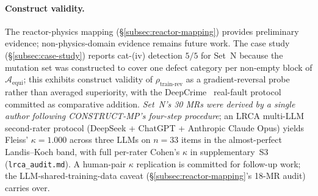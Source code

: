 \documentclass[acmsmall, screen]{acmart}
\begin{document}
\paragraph{Construct validity.} The reactor-physics mapping (\S\ref{subsec:reactor-mapping}) provides preliminary evidence; non-physics-domain evidence remains future work. The case study (\S\ref{subsec:case-study}) reports cat-(iv) detection $5/5$ for Set~N because the mutation set was constructed to cover one defect category per non-empty block of $\mathcal{A}_{\mathrm{equi}}$; this exhibits construct validity of $\rho_{\mathrm{train\text{-}rev}}$ as a gradient-reversal probe rather than averaged superiority, with the DeepCrime~\cite{Humbatova2021DeepCrime} real-fault protocol committed as comparative addition. \emph{Set~N's 30 MRs were derived by a single author following CONSTRUCT-MP's four-step procedure}; an LRCA multi-LLM second-rater protocol (DeepSeek + ChatGPT + Anthropic Claude Opus) yields Fleiss' $\kappa = 1.000$ across three LLMs on $n = 33$ items in the almost-perfect Landis--Koch band, with full per-rater Cohen's $\kappa$ in supplementary~S3 (\texttt{lrca\_audit.md}). A human-pair $\kappa$ replication is committed for follow-up work; the LLM-shared-training-data caveat (\S\ref{subsec:reactor-mapping}'s 18-MR audit) carries over.
\end{document}
